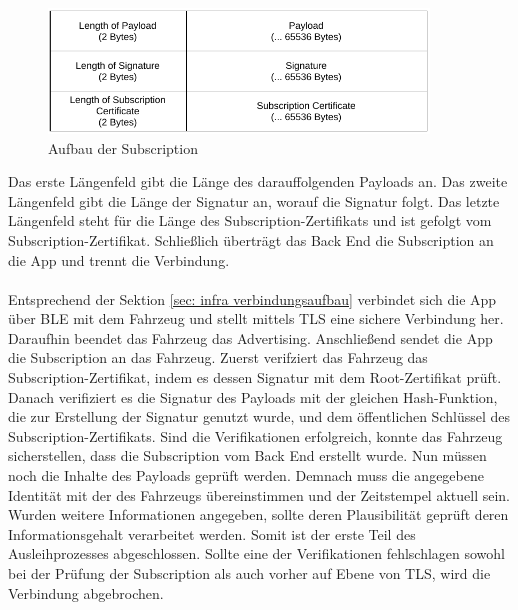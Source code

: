\begin{figure}[H]
    \centering
    \includegraphics[width=0.9\textwidth]{graphics/aufbau_subscription.pdf}
    \caption[Aufbau der Subscription]{Aufbau der Subscription}
    \label{fig: aufbau subscription}
\end{figure}
Das erste Längenfeld gibt die Länge des darauffolgenden Payloads an. Das zweite Längenfeld gibt die Länge der Signatur an, worauf die Signatur folgt. Das letzte Längenfeld steht für die Länge des Subscription-Zertifikats und ist gefolgt vom Subscription-Zertifikat. Schließlich überträgt das Back End die Subscription an die App und trennt die Verbindung.
\\\\
Entsprechend der Sektion \ref{sec: infra verbindungsaufbau} verbindet sich die App über BLE mit dem Fahrzeug und stellt mittels TLS eine sichere Verbindung her. Daraufhin beendet das Fahrzeug das Advertising. Anschließend sendet die App die Subscription an das Fahrzeug. Zuerst verifziert das Fahrzeug das Subscription-Zertifikat, indem es dessen Signatur mit dem Root-Zertifikat prüft. Danach verifiziert es die Signatur des Payloads mit der gleichen Hash-Funktion, die zur Erstellung der Signatur genutzt wurde, und dem öffentlichen Schlüssel des Subscription-Zertifikats. Sind die Verifikationen erfolgreich, konnte das Fahrzeug sicherstellen, dass die Subscription vom Back End erstellt wurde. Nun müssen noch die Inhalte des Payloads geprüft werden. Demnach muss die angegebene Identität mit der des Fahrzeugs übereinstimmen und der Zeitstempel aktuell sein. Wurden weitere Informationen angegeben, sollte deren Plausibilität geprüft deren Informationsgehalt verarbeitet werden. Somit ist der erste Teil des Ausleihprozesses abgeschlossen. Sollte eine der Verifikationen fehlschlagen sowohl bei der Prüfung der Subscription als auch vorher auf Ebene von TLS, wird die Verbindung abgebrochen.